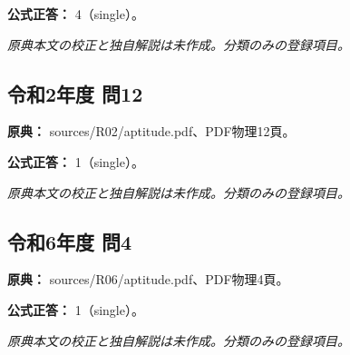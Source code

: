 \textbf{公式正答：} 4（single）。

\par\textit{原典本文の校正と独自解説は未作成。分類のみの登録項目。}

\subsection{令和2年度 問12}
\label{q:r02-reg-apt-12}

\noindent\textbf{原典：} sources/R02/aptitude.pdf、PDF物理12頁。

\textbf{公式正答：} 1（single）。

\par\textit{原典本文の校正と独自解説は未作成。分類のみの登録項目。}

\subsection{令和6年度 問4}
\label{q:r06-reg-apt-04}

\noindent\textbf{原典：} sources/R06/aptitude.pdf、PDF物理4頁。

\textbf{公式正答：} 1（single）。

\par\textit{原典本文の校正と独自解説は未作成。分類のみの登録項目。}
